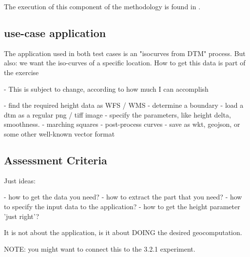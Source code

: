 The execution of this component of the methodology is found in .

\subsection{use-case application}
The application used in both test cases is an "isocurves from DTM" process. 
But also: we want the iso-curves of a specific location. How to get this data is part of the exercise

\begin{note}
- This is subject to change, according to how much I can accomplish 

- find the required height data as WFS / WMS
- determine a boundary
- load a dtm as a regular png / tiff image
- specify the parameters, like height delta, smoothness.
- marching squares
- post-process curves
- save as wkt, geojson, or some other well-known vector format


\end{note}

\subsection{Assessment Criteria}

\begin{note}
Just ideas:

  - how to get the data you need? 
  - how to extract the part that you need?
  - how to specify the input data to the application? 
  - how to get the height parameter 'just right'? 
  
It is not about the application, is it about DOING the desired geocomputation.  

NOTE: you might want to connect this to the 3.2.1 experiment.

\end{note}
  

